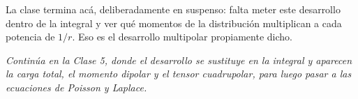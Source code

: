\documentclass[12pt,a4paper]{article}
\begin{document}
La clase termina acá, deliberadamente en suspenso: falta meter este desarrollo
dentro de la integral y ver qué momentos de la distribución multiplican a cada
potencia de $1/r$. Eso es el desarrollo multipolar propiamente dicho.

\bigskip
\noindent\emph{Continúa en la Clase 5, donde el desarrollo se sustituye en la
integral y aparecen la carga total, el momento dipolar y el tensor cuadrupolar,
para luego pasar a las ecuaciones de Poisson y Laplace.}
\end{document}
